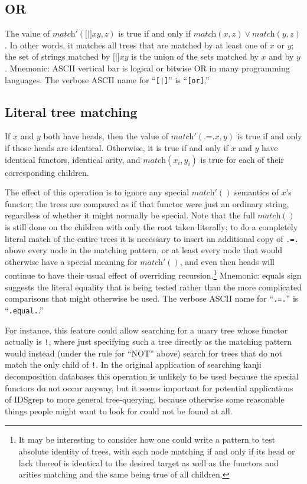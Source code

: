 \documentclass[twocolumn]{report}
\begin{document}
\subsection{OR}

The value of $\textit{match}'(\texttt{[|]}xy,z)$ is true if and only if
$\textit{match}(x,z) \vee \textit{match}(y,z)$.  In other words, it matches
all trees that are matched by at least one of $x$ or $y$; the set of strings
matched by $\texttt{[|]}xy$ is the union of the sets matched by $x$ and by
$y$.  Mnemonic: ASCII vertical bar is logical or bitwise OR in many
programming languages.
The verbose ASCII name for ``\texttt{[|]}'' is ``\texttt{[or]}.''

\subsection{Literal tree matching}

If $x$ and $y$ both have heads, then the value of
$\textit{match}'(\texttt{.=.}x,y)$ is true if and only if those heads are
identical.  Otherwise, it is true if and only if $x$ and $y$ have identical
functors, identical arity, and $\textit{match}(x_i,y_i)$ is true for each of
their corresponding children.

The effect of this operation is to ignore any special $\textit{match}'()$
semantics of $x$'s functor; the trees are compared as if that functor were
just an ordinary string, regardless of whether it might normally be special. 
Note that the full $\textit{match}()$ is still done on the children with
only the root taken literally; to do a completely literal match of the
entire trees it is necessary to insert an additional copy of \texttt{.=.}
above every node in the matching pattern, or at least every node that would
otherwise have a special meaning for $\textit{match}'()$, and even then
heads will continue to have their usual effect of overriding
recursion.\footnote{It may be interesting to consider how one could write a
pattern to test absolute identity of trees, with each node matching if and
only if its head or lack thereof is identical to the desired target as well
as the functors and arities matching and the same being true of all
children.} Mnemonic: equals sign suggests the literal equality that is being
tested rather than the more complicated comparisons that might otherwise be
used.
The verbose ASCII name for ``\texttt{.=.}'' is ``\texttt{.equal.}.''

For instance, this feature could allow searching for a unary tree whose
functor actually is \texttt{!}, where just specifying such a tree directly
as the matching pattern would instead (under the rule for ``NOT'' above)
search for trees that do not match the only child of \texttt{!}.  In the
original application of searching kanji decomposition databases this
operation is unlikely to be used because the special functors do not occur
anyway, but it seems important for potential applications of IDSgrep to more
general tree-querying, because otherwise some reasonable things people might
want to look for could not be found at all.
\end{document}
